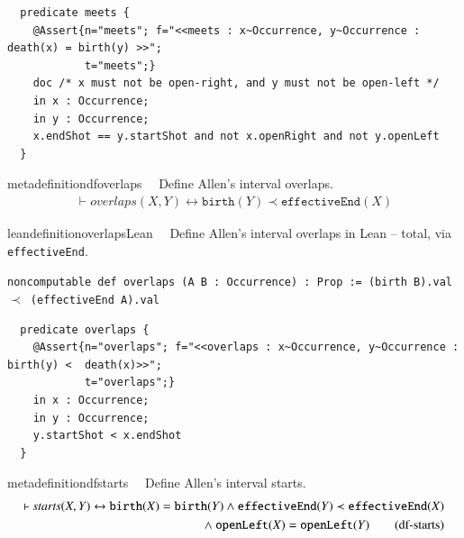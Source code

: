 \begin{lstlisting}
  predicate meets {
    @Assert{n="meets"; f="<<meets : x~Occurrence, y~Occurrence : death(x) = birth(y) >>"; 
    		t="meets";}
    doc /* x must not be open-right, and y must not be open-left */
    in x : Occurrence;
    in y : Occurrence;
    x.endShot == y.startShot and not x.openRight and not y.openLeft
  }
\end{lstlisting}
\begin{restatable}{metadefinition}{dfoverlaps}~~ Define Allen's interval overlaps.
\begin{align}
\vdash \textit{overlaps}(X,Y) \leftrightarrow \texttt{birth}(Y) \prec \texttt{effectiveEnd}(X)
\label{eq:df-overlaps}\tag{df-overlaps}
\end{align}
\end{restatable}

\begin{restatable}{leandefinition}{overlapsLean}~~ Define Allen's interval overlaps in Lean
-- total, via \texttt{effectiveEnd}.

\texttt{\textcolor{leancolor}{noncomputable def} \textcolor{leanyellow}{overlaps} (A B : Occurrence) : Prop := (birth B).val $\prec$ (effectiveEnd A).val}
\label{overlaps}
\end{restatable}

\begin{lstlisting}
  predicate overlaps {
    @Assert{n="overlaps"; f="<<overlaps : x~Occurrence, y~Occurrence : birth(y) <  death(x)>>"; 
    		t="overlaps";}
    in x : Occurrence;
    in y : Occurrence;
    y.startShot < x.endShot
  }
\end{lstlisting}
\begin{restatable}{metadefinition}{dfstarts}~~ Define Allen's interval starts.
\begin{align}
\vdash \textit{starts}(X,Y) \leftrightarrow \texttt{birth}(X) = \texttt{birth}(Y) \wedge \texttt{effectiveEnd}(Y) \prec \texttt{effectiveEnd}(X) \notag \\
~\wedge~ \texttt{openLeft}(X) = \texttt{openLeft}(Y)
\label{eq:df-starts}\tag{df-starts}
\end{align}
\end{restatable}

